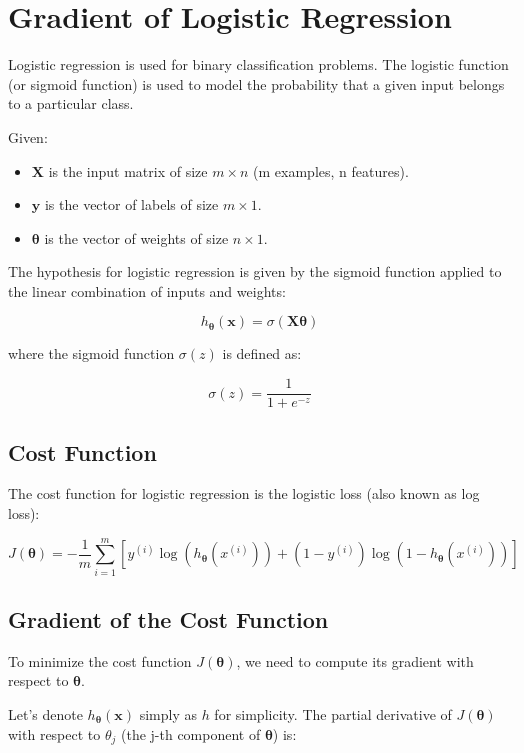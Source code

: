 \section*{Gradient of Logistic Regression}

Logistic regression is used for binary classification problems. The logistic function (or sigmoid function) is used to model the probability that a given input belongs to a particular class.

Given:
\begin{itemize}
    \item $\mathbf{X}$ is the input matrix of size $m \times n$ (m examples, n features).
    \item $\mathbf{y}$ is the vector of labels of size $m \times 1$.
    \item $\boldsymbol{\theta}$ is the vector of weights of size $n \times 1$.
\end{itemize}

The hypothesis for logistic regression is given by the sigmoid function applied to the linear combination of inputs and weights:

\[
h_{\boldsymbol{\theta}}(\mathbf{x}) = \sigma(\mathbf{X} \boldsymbol{\theta})
\]

where the sigmoid function $\sigma(z)$ is defined as:

\[
\sigma(z) = \frac{1}{1 + e^{-z}}
\]

\subsection*{Cost Function}

The cost function for logistic regression is the logistic loss (also known as log loss):

\[
J(\boldsymbol{\theta}) = -\frac{1}{m} \sum_{i=1}^m \left[ y^{(i)} \log(h_{\boldsymbol{\theta}}(x^{(i)})) + (1 - y^{(i)}) \log(1 - h_{\boldsymbol{\theta}}(x^{(i)})) \right]
\]

\subsection*{Gradient of the Cost Function}

To minimize the cost function $J(\boldsymbol{\theta})$, we need to compute its gradient with respect to $\boldsymbol{\theta}$.

Let's denote $h_{\boldsymbol{\theta}}(\mathbf{x})$ simply as $h$ for simplicity. The partial derivative of $J(\boldsymbol{\theta})$ with respect to $\theta_j$ (the j-th component of $\boldsymbol{\theta}$) is:

